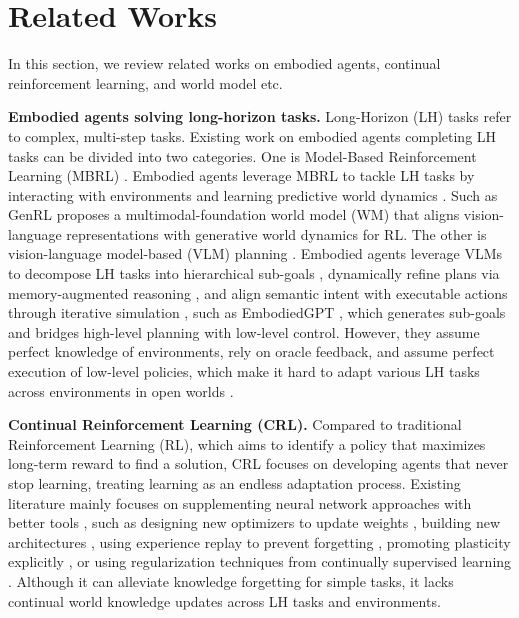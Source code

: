 \section{Related Works}
In this section, we review related works on embodied agents, continual reinforcement learning, and world model etc.

{\bf Embodied agents solving long-horizon tasks.} Long-Horizon (LH) tasks \cite{Guo2024CaStLCA, Chen2024ABF, Pirk2020ModelingLT} refer to complex, multi-step tasks. Existing work on embodied agents completing LH tasks can be divided into two categories. One is Model-Based Reinforcement Learning (MBRL) \cite{Mazzaglia2024MultimodalFW}. Embodied agents leverage MBRL to tackle LH tasks by interacting with environments and learning predictive world dynamics \cite{Liu2024ReLEPAN}. Such as GenRL \cite{Mazzaglia2024GenRLMW} proposes a multimodal-foundation world model (WM) that aligns vision-language representations with generative world dynamics for RL. The other is vision-language model-based (VLM) planning \cite{Roger2025RobinAS}. Embodied agents leverage VLMs to decompose LH tasks into hierarchical sub-goals \cite{Liu2024ReLEPAN}, dynamically refine plans via memory-augmented reasoning \cite{Song2024TowardsLV}, and align semantic intent with executable actions through iterative simulation \cite{Yang2024GuidingLT}, such as EmbodiedGPT \cite{EmbodiedGPT}, which generates sub-goals and bridges high-level planning with low-level control. However, they assume perfect knowledge of environments, rely on oracle feedback, and assume perfect execution of low-level policies, which make it hard to adapt various LH tasks across environments in open worlds \cite{Zhang2024VLABenchAL}.

{\bf Continual Reinforcement Learning (CRL).} Compared to traditional Reinforcement Learning (RL), which aims to identify a policy that maximizes long-term reward to find a solution, CRL \cite{Abel2023ADO} focuses on developing agents that never stop learning, treating learning as an endless adaptation process. Existing literature mainly focuses on supplementing neural network approaches with better tools \cite{tomilin2024coom}, such as designing new optimizers to update weights \cite{delfosse2024hackatari}, building new architectures \cite{zhang2024cppo}, using experience replay to prevent forgetting \cite{Caccia2022TaskAgnosticCR}, promoting plasticity explicitly \cite{Nikishin2022ThePB}, or using regularization techniques from continually supervised learning \cite{Javed2019MetaLearningRF}. Although it can alleviate knowledge forgetting for simple tasks, it lacks continual world knowledge updates across LH tasks and environments.

